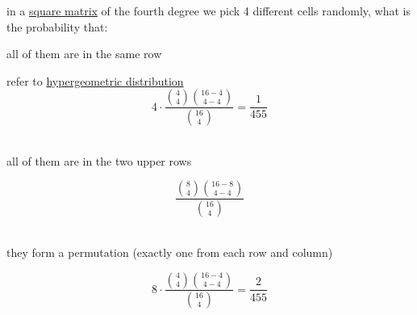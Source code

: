 \documentclass[a4paper,12pt]{article}
\begin{document}
\begin{question}
in a \href{linear_algebra2.org}{square matrix} of the fourth degree we pick 4 different cells randomly, what is the probability that:\\
\begin{subquestion}
all of them are in the same row\\
\begin{answer}
refer to \href{20230113165622-hypergeometric_distribution.org}{hypergeometric distribution}\\
\[
4 \cdot \frac{\binom{4}{4} \binom{16-4}{4-4}}{\binom{16}{4}} = \frac{1}{455}
\]\\
\end{answer}
\end{subquestion}
\begin{subquestion}
all of them are in the two upper rows\\
\begin{answer}
\[
\frac{\binom{8}{4} \binom{16-8}{4-4}}{\binom{16}{4}}
\]\\
\end{answer}
\end{subquestion}
\begin{subquestion}
they form a permutation (exactly one from each row and column)\\
\begin{answer}
\[
8 \cdot \frac{\binom{4}{4} \binom{16-4}{4-4}}{\binom{16}{4}} = \frac{2}{455}
\]\\
\end{answer}
\end{subquestion}
\end{question}
\end{document}
